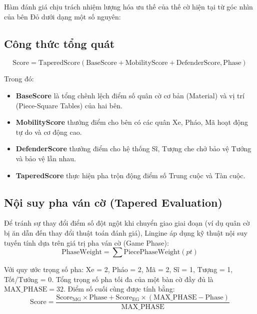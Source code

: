 Hàm đánh giá chịu trách nhiệm lượng hóa ưu thế của thế cờ hiện tại từ góc nhìn của bên Đỏ dưới dạng một số nguyên:

\subsection{Công thức tổng quát}

\[ \text{Score} = \text{TaperedScore}(\text{BaseScore} + \text{MobilityScore} + \text{DefenderScore}, \text{Phase}) \]

Trong đó:
\begin{itemize}
    \item \textbf{BaseScore} là tổng chênh lệch điểm số quân cờ cơ bản (Material) và vị trí (Piece-Square Tables) của hai bên.
    \item \textbf{MobilityScore} thưởng điểm cho bên có các quân Xe, Pháo, Mã hoạt động tự do và cơ động cao.
    \item \textbf{DefenderScore} thưởng điểm cho hệ thống Sĩ, Tượng che chở bảo vệ Tướng và bảo vệ lẫn nhau.
    \item \textbf{TaperedScore} thực hiện pha trộn động điểm số Trung cuộc và Tàn cuộc.
\end{itemize}


\subsection{Nội suy pha ván cờ (Tapered Evaluation)}

Để tránh sự thay đổi điểm số đột ngột khi chuyển giao giai đoạn (ví dụ quân cờ bị ăn dẫn đến thay đổi thuật toán đánh giá), Lingine áp dụng kỹ thuật nội suy tuyến tính dựa trên giá trị pha ván cờ (Game Phase):
\[ \text{PhaseWeight} = \sum \text{PiecePhaseWeight}(pt) \]

Với quy ước trọng số pha: Xe = 2, Pháo = 2, Mã = 2, Sĩ = 1, Tượng = 1, Tốt/Tướng = 0. Tổng trọng số pha tối đa của một bàn cờ đầy đủ là $\text{MAX\_PHASE} = 32$. Điểm số cuối cùng được tính bằng:
\[ \text{Score} = \frac{\text{Score}_{\text{MG}} \times \text{Phase} + \text{Score}_{\text{EG}} \times (\text{MAX\_PHASE} - \text{Phase})}{\text{MAX\_PHASE}} \]

